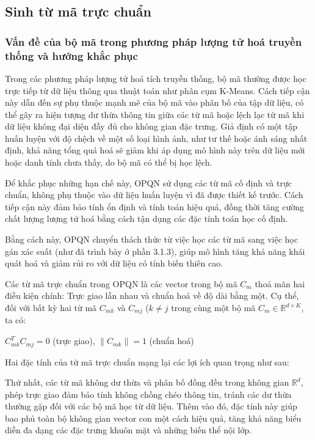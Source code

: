 \subsection{Sinh từ mã trực chuẩn}
\subsubsection{Vấn đề của bộ mã trong phương pháp lượng tử hoá truyền thống và hướng khắc phục} 
Trong các phương pháp lượng tử hoá tích truyền thống, bộ mã thường được học trực tiếp từ dữ liệu thông qua thuật toán như phân cụm K-Means. Cách tiếp cận này dẫn đến sự phụ thuộc mạnh mẽ của bộ mã vào phân bố của tập dữ liệu, có thể gây ra hiện tượng dư thừa thông tin giữa các từ mã hoặc lệch lạc từ mã khi dữ liệu không đại diện đầy đủ cho không gian đặc trưng. Giả định có một tập huấn luyện với độ chệch về một số loại hình ảnh, như tư thế hoặc ánh sáng nhất định, khả năng tổng quá hoá sẽ giảm khi áp dụng mô hình này trên dữ liệu mới hoặc danh tính chưa thấy, do bộ mã có thể bị học lệch.

Để khắc phục những hạn chế này, OPQN sử dụng các từ mã cố định và trực chuẩn, không phụ thuộc vào dữ liệu huấn luyện vì đã được thiết kế trước. Cách tiếp cận này đảm bảo tính ổn định và tính toán hiệu quả, đồng thời tăng cường chất lượng lượng tử hoá bằng cách tận dụng các đặc tính toán học cố định. 

Bằng cách này, OPQN chuyển thách thức từ việc học các từ mã sang việc học gán xác suất (như đã trình bày ở phần 3.1.3), giúp mô hình tăng khả năng khái quát hoá và giảm rủi ro với dữ liệu có tính biến thiên cao.

Các từ mã trực chuẩn trong OPQN là các vector trong bộ mã $C_m$ thoả mãn hai điều kiện chính: Trực giao lẫn nhau và chuẩn hoá về độ dài bằng một. Cụ thể, đối với bất kỳ hai từ mã $C_{mk}$ và $C_{mj}$ ($k \neq j$ trong cùng một bộ mã $C_m \in \mathbb{R}^{d \times K}$, ta có:

$C^T_{mk} C_{mj} = 0$ (trực giao), $\|C_{mk}\| = 1$ (chuẩn hoá)

Hai đặc tính của từ mã trực chuẩn mạng lại các lợi ích quan trọng như sau:

Thứ nhất, các từ mã không dư thừa và phân bố đồng đều trong không gian $\mathbb{R}^d$, phép trực giao đảm bảo tính không chồng chéo thông tin, tránh các dư thừa thường gặp đối với các bộ mã học từ dữ liệu. Thêm vào đó, đặc tính này giúp bao phủ toàn bộ không gian vector con một cách hiệu quả, tăng khả năng biểu diễn đa dạng các đặc trưng khuôn mặt và những biến thể nội lớp.

